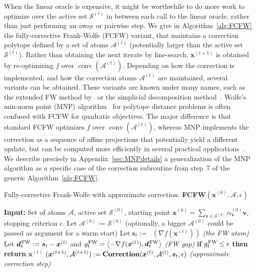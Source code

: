 \documentclass{article} %
\DeclareMathOperator*{\conv}{conv}
\newcommand{\FW}{{\hspace{0.05em}\textnormal{FW}}}
\newcommand{\x}{\bm{x}}
\newcommand{\s}{\bm{s}}
\newcommand{\dd}{\bm{d}}
\newcommand{\vv}{\bm{v}} %
\DeclareMathOperator*{\lmo}{LMO_{\!\Vertices}}
\newcommand{\Vertices}{\mathcal{A}} %
\newcommand{\Coreset}{\mathcal{S}}
\newcommand{\innerProd}[2]{\left\langle #1 , #2 \right\rangle}
\newcommand{\0}{\mathbf{0}} %
\begin{document}
When the linear oracle is expensive, it might be worthwhile to do more work
to optimize over the active set $\Coreset^{(t)}$ in between each call to the
linear oracle, rather than just performing an away or pairwise step. We give
in Algorithm~\ref{alg:FCFW} the fully-corrective Frank-Wolfe (FCFW) variant,
that maintains a correction polytope defined by a set of atoms
$\Vertices^{(t)}$ (potentially larger than the active set $\Coreset^{(t)}$).
Rather than obtaining the next iterate by line-search, $\x^{(t+1)}$ is
obtained by re-optimizing $f$ over $\conv(\Vertices^{(t)})$. Depending on how
the correction is implemented, and how the correction atoms $\Vertices^{(t)}$
are maintained, several variants can be obtained. 
%
These variants are known
under many names, such as the extended FW method
by~\citet{Holloway:1974:FCFW} or the simplicial decomposition
method~\citep{Hohenbalken:1977:simplicial,Hearn:1987:simplicial}. 
Wolfe's min-norm point (MNP) algorithm~\citep{Wolfe:1976:MNP} for polytope distance problems is often confused with 
FCFW for quadratic objectives.  The major difference is that standard FCFW optimizes $f$ over $\conv(\Vertices^{(t)})$, whereas MNP implements the correction as a sequence of affine projections that potentially yield a different update, but can be computed more efficiently in several practical applications~\citep{Wolfe:1976:MNP}.
We describe precisely in Appendix~\ref{sec:MNPdetails} a generalization of the MNP algorithm as a specific case of the correction subroutine from step~7 of the generic Algorithm~\ref{alg:FCFW}.\vspace{-1mm}

%
%
%
%
%
%
%
%
%
%
%
%
%
%
%
%
%
%
%

%

\begin{algorithm}
	\caption{Fully-corrective Frank-Wolfe with approximate correction: \textbf{FCFW}$(\x^{(0)}, \Vertices, \epsilon)$}
	\label{alg:FCFW}
	\begin{algorithmic}[1]
	\STATE \textbf{Input:} Set of atoms $\Vertices$, active set $\Coreset^{(0)}$, starting point $\x^{(0)}= \displaystyle \sum_{\vv \in \Coreset^{(0)}} \alpha^{(0)}_{\vv} \vv$, stopping criterion $\epsilon$.
	\STATE Let $\Vertices^{(0)} := \Coreset^{(0)}$ \quad (optionally, a bigger $\Vertices^{(0)}$ could be passed as argument for a warm start)
		\STATE Let $\s_t := \lmo \!\left(\nabla f(\x^{(t)})\right)$%
			\hspace{4cm} \emph{\small(the FW atom)}
		\STATE Let $\dd_t^\FW := \s_t - \x^{(t)}$ and $g_t^\FW = \innerProd{-\nabla f(\x^{(t)})}{\dd_t^\FW}$ \qquad \emph{\small(FW gap)}
		\STATE \textbf{if} $g_t^\FW \leq \epsilon$ \textbf{then} \textbf{return} $\x^{(t)}$
			\STATE $(\x^{(t+1)}, \Vertices^{(t+1)}) := \textbf{\textrm{Correction}}(\x^{(t)}, \Vertices^{(t)}, \s_t, \epsilon)$ \hspace{1.2cm} \emph{\small (approximate correction step)}
	\ENDFOR
	\end{algorithmic}
\end{algorithm}
\end{document}
